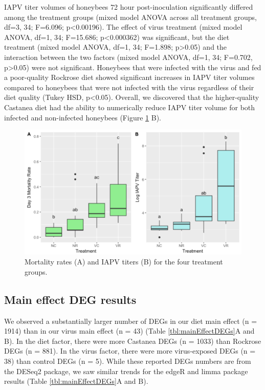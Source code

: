 \documentclass[11pt,a4paper,oldfontcommands,openany]{memoir}
\numberwithin{equation}{section} %
\begin{document}
IAPV titer volumes of honeybees 72 hour post-inoculation significantly differed among the treatment groups (mixed model ANOVA across all treatment groups, df=3, 34; F=6.096; p<0.00196). The effect of virus treatment (mixed model ANOVA, df=1, 34; F=15.686; p<0.000362) was significant, but the diet treatment (mixed model ANOVA, df=1, 34; F=1.898; p>0.05) and the interaction between the two factors (mixed model ANOVA, df=1, 34; F=0.702, p>0.05) were not significant. Honeybees that were infected with the virus and fed a poor-quality Rockrose diet showed significant increases in IAPV titer volumes compared to honeybees that were not infected with the virus regardless of their diet quality (Tukey HSD, p<0.05). Overall, we discovered that the higher-quality Castanea diet had the ability to numerically reduce IAPV titer volume for both infected and non-infected honeybees (Figure \ref{fig:mortality} B).

\begin{figure}[H]
\centering
  \begin{framed}
  \includegraphics[width=\textwidth]{Images/mortality}
  \end{framed}
  \caption{Mortality rates (A) and IAPV titers (B) for the four treatment groups.}
  \label{fig:mortality}
\end{figure}

\subsection{Main effect DEG results}

We observed a substantially larger number of DEGs in our diet main effect (n = 1914) than in our virus main effect (n = 43) (Table \ref{tbl:mainEffectDEGs}A and B). In the diet factor, there were more Castanea DEGs (n = 1033) than Rockrose DEGs (n = 881). In the virus factor, there were more virus-exposed DEGs (n = 38) than control DEGs (n = 5). While these reported DEGs numbers are from the DESeq2 package, we saw similar trends for the edgeR and limma package results (Table \ref{tbl:mainEffectDEGs}A and B).
\end{document}
